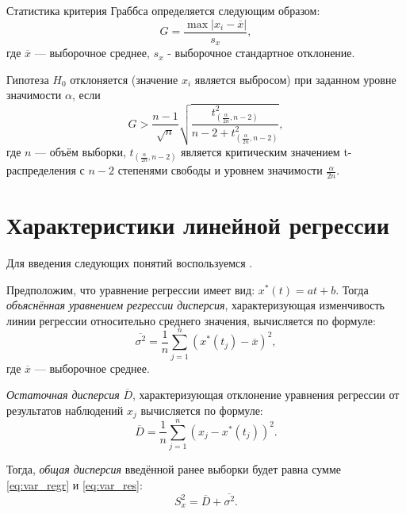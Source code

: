 Статистика критерия Граббса определяется следующим образом:
\begin{equation*}
	G = \frac{\max \vert x_i - \overline{x} \vert}{s_x},
\end{equation*}
где $\overline{x}$ --- выборочное среднее, $s_x$ - выборочное стандартное отклонение.

Гипотеза $H_0$ отклоняется (значение $x_i$ является выбросом) при заданном уровне значимости $\alpha$, если
\begin{equation*}
	G > \frac{n-1}{\sqrt{n}} \sqrt{\frac{t_{\left( \frac{\alpha}{2n}, n - 2 \right)}^2}{n - 2 + t_{\left( \frac{\alpha}{2n}, n - 2 \right)}^2}},
\end{equation*}
где $n$ --- объём выборки, $t_{\left( \frac{\alpha }{2n}, n - 2 \right)}$ является критическим значением t-распределения с $n - 2$ степенями свободы и уровнем значимости $\frac{\alpha}{2n}$.


\section*{Характеристики линейной регрессии} %
\label{sec:chars_regr}

Для введения следующих понятий воспользуемся \cite{Eddows1997}.

Предположим, что уравнение регрессии имеет вид: $x^{*}(t) = at + b$. Тогда \textit{объяснённая уравнением регрессии дисперсия}, характеризующая изменчивость линии регрессии относительно среднего значения, вычисляется по формуле:
\begin{equation}
\label{eq:var_regr}
	\overline{\sigma^2} = \frac{1}{n} \sum_{j=1}^{n}{(x^{*}(t_j) - \overline{x})^2},
\end{equation}
где $\overline{x}$ --- выборочное среднее.

\textit{Остаточная дисперсия} $\overline{D}$, характеризующая отклонение уравнения регрессии от результатов наблюдений $x_j$ вычисляется по формуле:
\begin{equation}
\label{eq:var_res}
	\overline{D} = \frac{1}{n} \sum_{j=1}^{n}{(x_j - x^{*}(t_j))^2}.
\end{equation}

Тогда, \textit{общая дисперсия} введённой ранее выборки будет равна сумме \eqref{eq:var_regr} и \eqref{eq:var_res}:
\begin{equation*}
	S_x^2 = \overline{D} + \overline{\sigma^2}.
\end{equation*}

